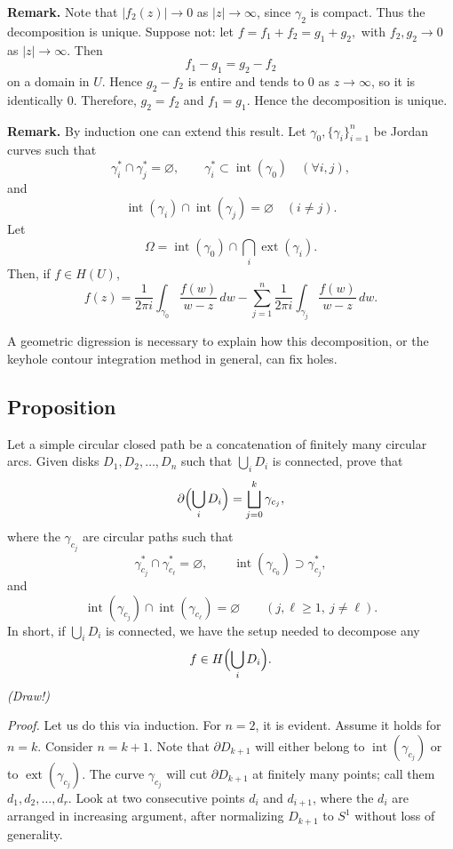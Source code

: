 \documentclass[11pt,a4paper]{article}
\begin{document}
\textbf{Remark.} Note that $|f_2(z)|\to0$ as $|z|\to\infty$, since $\gamma_2$ is compact. Thus the decomposition is unique. Suppose not: let \(f=f_1+f_2=g_1+g_2,\)
with $f_2,g_2\to0$ as $|z|\to\infty$. Then
\[
  f_1-g_1=g_2-f_2
\]
on a domain in $U$. Hence $g_2-f_2$ is entire and tends to $0$ as $z\to\infty$, so it is identically $0$. Therefore, $g_2=f_2$ and $f_1=g_1$. Hence the decomposition is unique.

\textbf{Remark.} By induction one can extend this result. Let $\gamma_0,\{\gamma_i\}_{i=1}^n$ be Jordan curves such that
\[
  \gamma_i^*\cap\gamma_j^*=\varnothing,
  \qquad
  \gamma_i^*\subset\operatorname{int}(\gamma_0)
  \quad(\forall i,j),
\]
and
\[
  \operatorname{int}(\gamma_i)\cap\operatorname{int}(\gamma_j)=\varnothing
  \quad(i\ne j).
\]
Let
\[
  \Omega=\operatorname{int}(\gamma_0)\cap\bigcap_i\operatorname{ext}(\gamma_i).
\]
Then, if $f\in H(U)$,
\[
  f(z)=\frac{1}{2\pi i}\int_{\gamma_0}\frac{f(w)}{w-z}\,dw
  -\sum_{j=1}^n\frac{1}{2\pi i}\int_{\gamma_j}\frac{f(w)}{w-z}\,dw.
\]


A geometric digression is necessary to explain how this decomposition, or the keyhole contour integration method in general, can fix holes.

\subsection*{Proposition}

Let a simple circular closed path be a concatenation of finitely many circular arcs. Given disks $D_1,D_2,\ldots,D_n$ such that $\bigcup_iD_i$ is connected, prove that
\[
  \partial\Bigl(\bigcup_iD_i\Bigr)
  =\bigsqcup_{j=0}^{k}\gamma_{c_j},
\]
where the $\gamma_{c_j}$ are circular paths such that
\[
  \gamma_{c_j}^*\cap\gamma_{c_\ell}^*=\varnothing,
  \qquad
  \operatorname{int}(\gamma_{c_0})\supset\gamma_{c_j}^*,
\]
and
\[
  \operatorname{int}(\gamma_{c_j})\cap\operatorname{int}(\gamma_{c_\ell})
  =\varnothing
  \qquad (j,\ell\ge1,\ j\ne\ell).
\]
In short, if $\bigcup_iD_i$ is connected, we have the setup needed to decompose any
\[
  f\in H\Bigl(\bigcup_iD_i\Bigr).
\]
\emph{(Draw!)}

\textit{Proof.}
Let us do this via induction. For $n=2$, it is evident. Assume it holds for $n=k$. Consider $n=k+1$. Note that $\partial D_{k+1}$ will either belong to $\operatorname{int}(\gamma_{c_j})$ or to $\operatorname{ext}(\gamma_{c_j})$. The curve $\gamma_{c_j}$ will cut $\partial D_{k+1}$ at finitely many points; call them $d_1,d_2,\ldots,d_r$. Look at two consecutive points $d_i$ and $d_{i+1}$, where the $d_i$ are arranged in increasing argument, after normalizing $D_{k+1}$ to $S^1$ without loss of generality.
\end{document}
